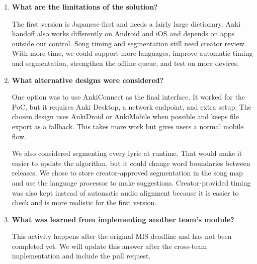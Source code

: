 \documentclass[12pt, titlepage]{article}
\begin{document}
\begin{enumerate}
  \item \textbf{What are the limitations of the solution?}

  The first version is Japanese-first and needs a fairly large dictionary.
  Anki handoff also works differently on Android and iOS and depends on apps
  outside our control.  Song timing and segmentation still need creator review.
  With more time, we could support more languages, improve automatic timing and
  segmentation, strengthen the offline queue, and test on more devices.

  \item \textbf{What alternative designs were considered?}

  One option was to use AnkiConnect as the final interface.  It worked for the
  PoC, but it requires Anki Desktop, a network endpoint, and extra setup.  The
  chosen design uses AnkiDroid or AnkiMobile when possible and keeps file export
  as a fallback.  This takes more work but gives users a normal mobile flow.

  We also considered segmenting every lyric at runtime.  That would make it
  easier to update the algorithm, but it could change word boundaries between
  releases.  We chose to store creator-approved segmentation in the song map
  and use the language processor to make suggestions.  Creator-provided timing
  was also kept instead of automatic audio alignment because it is easier to
  check and is more realistic for the first version.

  \item \textbf{What was learned from implementing another team's module?}

  This activity happens after the original MIS deadline and has not been
  completed yet.  We will update this answer after the cross-team implementation
  and include the pull request.

\end{enumerate}
\end{document}
